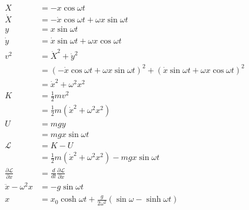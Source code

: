\documentclass{article}
\begin{document}
\begin{align*}
  X                                       & = -x \cos \omega t                                                                                         \\
  \dot{X}                                 & = -\dot{x} \cos \omega t + \omega x \sin \omega t                                                          \\
  y                                       & = x \sin \omega t                                                                                          \\
  \dot{y}                                 & = \dot{x} \sin \omega t + \omega x \cos \omega t                                                           \\
  v^2                                     & = \dot{X}^2 + \dot{y}^2                                                                                    \\
                                          & = (-\dot{x} \cos \omega t + \omega x \sin \omega t)^2 + (\dot{x} \sin \omega t + \omega x \cos \omega t)^2 \\
                                          & = \dot{x}^2 + \omega^2 x^2                                                                                 \\
  K                                       & = \frac{1}{2} m v^2                                                                                        \\
                                          & = \frac{1}{2} m (\dot{x}^2 + \omega^2 x^2)                                                                 \\
  U                                       & = m g y                                                                                                    \\
                                          & = m g x \sin \omega t                                                                                      \\
  \mathcal{L}                             & = K - U                                                                                                    \\
                                          & = \frac{1}{2} m (\dot{x}^2 + \omega^2 x^2) - m g x \sin \omega t                                           \\
  \frac{\partial \mathcal{L}}{\partial x} & = \frac{d}{d t} \frac{\partial \mathcal{L}}{\partial \dot{x}}                                              \\
  \ddot{x} - \omega^2 x                   & = -g \sin \omega t                                                                                         \\
  x                                       & = x_0 \cosh \omega t + \frac{g}{2 \omega^2} (\sin \omega - \sinh \omega t)
\end{align*}
\end{document}
